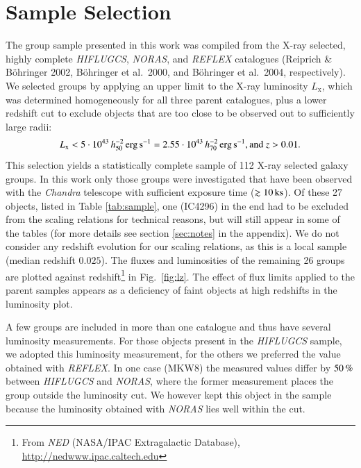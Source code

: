 \documentclass[structabstract]{aa}
\begin{document}
\section{Sample Selection}\label{sec:sample}
The group sample presented in this work was compiled from the X-ray selected,
highly complete \emph{HIFLUGCS}, \emph{NORAS}, and \emph{REFLEX} catalogues
(Reiprich \& B\"ohringer 2002, B\"ohringer et al.\ 2000, and B\"ohringer et
al.\ 2004, respectively). We selected groups by applying an upper limit to
the X-ray luminosity $L_{\text{x}}$, which was determined homogeneously for all three
parent catalogues, plus a lower redshift cut to exclude objects that are too
close to be observed out to sufficiently large radii:%
\begin{equation*}
L_{\text{x}}<
5\cdot\unit[10^{43}\,h^{-2}_{50}]{erg\,s^{-1}}=2.55\cdot\unit[10^{43}\,h^{-2}_{70}]{erg\,s^{-1}},
\text{and } z >0.01.
\end{equation*}
This selection yields a statistically complete sample of 112 X-ray
selected galaxy groups. In this work only those groups were
investigated that have been observed with the \emph{Chandra} telescope
with sufficient exposure time ($\unit[\gtrsim 10]{ks}$). Of these 27
objects, listed in Table \ref{tab:sample}, one (IC4296) in the end had
to be excluded from the scaling relations for technical reasons, but
will still appear in some of the tables (for more details see section
\ref{sec:notes} in the appendix).  We do not consider any redshift
evolution for our scaling relations, as this is a local sample (median
redshift $0.025$). The fluxes and luminosities of the remaining 26
groups are plotted against redshift\footnote{From \emph{NED}
  (NASA/IPAC Extragalactic Database),
  \url{http://nedwww.ipac.caltech.edu}} in Fig.\ \ref{fig:lz}. The
effect of flux limits applied to the parent samples appears as a
deficiency of faint objects at high redshifts in the luminosity plot.

A few groups are included in more than one catalogue and thus have several
luminosity measurements. For those objects present in the \emph{HIFLUGCS}
sample, we adopted this luminosity measurement, for the others we preferred
the value obtained with \emph{REFLEX}. In one case (MKW8) the measured values
differ by $\unit[50]{\%}$ between \emph{HIFLUGCS} and \emph{NORAS}, where the
former measurement places the group outside the luminosity cut. We however
kept this object in the sample because the luminosity obtained with
\emph{NORAS} lies well within the cut.
\end{document}
